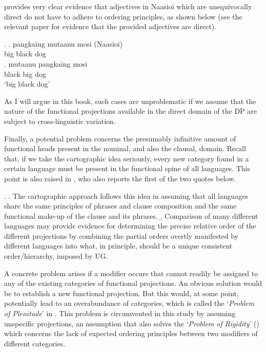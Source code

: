 \documentclass [output=book,colorlinks,citecolor=brown]{langscibook}
\begin{document}
\citet{brown:2024:adj} provides very clear evidence that adjectives in Naasioi which are unequivocally direct do not have to adhere to ordering principles, as shown below (see the relevant paper for evidence that the provided adjectives are direct).

\ex. \ag. pangkaing mutaanu mosi (Naasioi)\\
big black dog\\
\bg. mutaanu pangkaing mosi\\
black big dog\\
`big black dog’ \null \hfill \citep[428]{brown:2024:adj}

As I will argue in this book, such cases are unproblematic if we assume that the nature of the functional projections available in the direct domain of the DP are subject to cross-linguistic variation.

Finally, a potential problem concerns the presumably infinitive amount of functional heads present in the nominal, and also the clausal, domain. Recall that, if we take the cartographic idea seriously, every new category found in a certain language must be present in the functional spine of all languages. This point is also raised in \citet{larson:2021:rethinking}, who also reports the first of the two quotes below.

\ex. \a. The cartographic approach follows this idea in assuming that all languages share the same principles of phrases and clause composition and the same functional make-up of the clause and its phrases. \citep[68]{cinriz:2010:carto}
\b. Comparison of many different languages may provide evidence for determining the precise relative order of the different projections by combining the partial orders overtly manifested by different languages into what, in principle, should be a unique consistent order/hierarchy, imposed by UG. \citep[72]{cinriz:2010:carto}

A concrete problem arises if a modifier occurs that cannot readily be assigned to any of the existing categories of functional projections. An obvious solution would be to establish a new functional projection. But this would, at some point, potentially lead to an overabundance of categories, which is called the `\textit{Problem of Plenitude}’ in \citet[248–249]{larson:2021:rethinking}. This problem is circumvented in this study by assuming unspecific projections, an assumption that also solves the `\textit{Problem of Rigidity}’ (\citealt[249–250]{larson:2021:rethinking}) which concerns the lack of expected ordering principles between two modifiers of different categories. %
\end{document}
